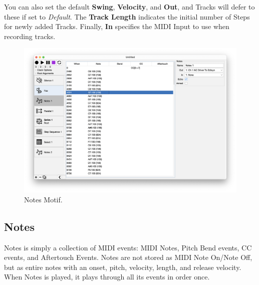 \documentclass[twoside,10pt]{article}
\newcommand\ignore[1]{}
\begin{document}
You can also set the default {\bf Swing}, {\bf Velocity}, and {\bf Out}, and Tracks will defer to these if set to {\it Default}.  The {\bf Track Length} indicates the initial number of Steps for newly added Tracks. Finally, {\bf In} specifies the MIDI Input to use when recording tracks.

\ignore{
\paragraph{Recording a Step Sequence}

If you arm one or more Tracks, set their Notes, and set the Sequence's MIDI Input accordingly, then you can record in Notes to those tracks when you press Record on Seq.   You will find this easier if you turn on the metronome and if you set the Step Sequence to be the Root, so it records immediately.  Remember that if your Step Sequence motif is not a descendant of the Root, it will never be reached to do Recording.
}


\clearpage

\begin{figure}[t]
\centering
\includegraphics[width=6.5in]{Notes}
\vspace{-2em}
\caption{Notes Motif.}
\label{notes}
\end{figure}

\subsection{Notes}
 
Notes is simply a collection of MIDI events: MIDI Notes, Pitch Bend events, CC events, and Aftertouch Events.  Notes are not stored as MIDI Note On/Note Off, but as entire notes with an onset, pitch, velocity, length, and release velocity.   When Notes is played, it plays through all its events in order once.
\end{document}
